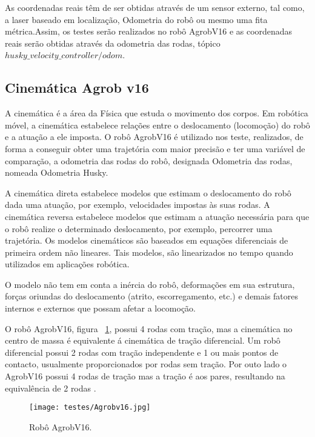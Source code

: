 As coordenadas reais têm de ser obtidas através de um sensor externo, tal como, a laser baseado em localização, Odometria do robô ou mesmo uma fita métrica.Assim, os testes serão realizados no robô AgrobV16 e as coordenadas reais serão obtidas através da odometria das rodas, tópico \textit{$husky\_velocity\_controller/odom$}.

\subsection{Cinemática Agrob v16}

A cinemática é a área da Física que estuda o movimento dos corpos. Em robótica móvel, a cinemática estabelece relações entre o deslocamento (locomoção) do robô e a atuação a ele imposta. O robô AgrobV16 é utilizado nos teste, realizados, de forma a conseguir obter uma trajetória com maior precisão e ter uma variável de comparação, a odometria das rodas do robô, designada  Odometria das rodas, nomeada Odometria Husky. 

A cinemática direta estabelece modelos que estimam o deslocamento do robô dada uma atuação, por exemplo, velocidades impostas às suas rodas. A cinemática reversa estabelece modelos que estimam a atuação necessária para que o robô realize o determinado deslocamento, por exemplo, percorrer uma trajetória. Os modelos cinemáticos são baseados em equações diferenciais de primeira ordem não lineares. Tais modelos, são linearizados no tempo quando utilizados em aplicações robótica.


O modelo não tem em conta a inércia do robô, deformações em sua estrutura, forças oriundas do deslocamento (atrito, escorregamento, etc.) e demais fatores internos e externos que possam afetar a locomoção.


O robô AgrobV16, figura ~\ref{fig:agrobv16}, possui 4 rodas com tração, mas a cinemática no centro de massa é equivalente á cinemática de tração diferencial. Um robô diferencial possui 2 rodas com tração independente e 1 ou mais pontos de contacto, usualmente proporcionados por rodas sem tração. Por outo lado o AgrobV16 possui 4 rodas de tração mas a tração é aos pares, resultando na equivalência de 2 rodas .


\begin{figure}[h!] %
	\begin{center}
		\leavevmode		
		\texttt{[image: testes/Agrobv16.jpg]}
		\caption{Robô AgrobV16.}
		\label{fig:agrobv16}
	\end{center}
\end{figure}




